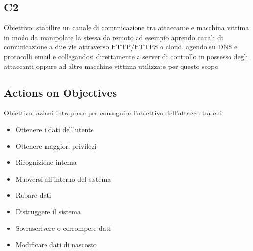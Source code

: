 \subsection{\acrfull{C2}}
Obiettivo: stabilire un canale di comunicazione tra attaccante e macchina vittima in modo da manipolare la stessa da remoto ad esempio aprendo canali di comunicazione a due vie attraverso \acrshort{HTTP}/\acrshort{HTTPS} o cloud, agendo su DNS e protocolli email e collegandosi direttamente a server di controllo in possesso degli attaccanti oppure ad altre macchine vittima utilizzate per questo scopo


\subsection{Actions on Objectives}
Obiettivo: azioni intraprese per conseguire l'obiettivo dell'attacco tra cui
\begin{itemize}[noitemsep]
    \item Ottenere i dati dell'utente
    \item Ottenere maggiori privilegi
    \item Ricognizione interna
    \item Muoversi all'interno del sistema
    \item Rubare dati
    \item Distruggere il sistema
    \item Sovrascrivere o corrompere dati
    \item Modificare dati di nascosto
\end{itemize}


